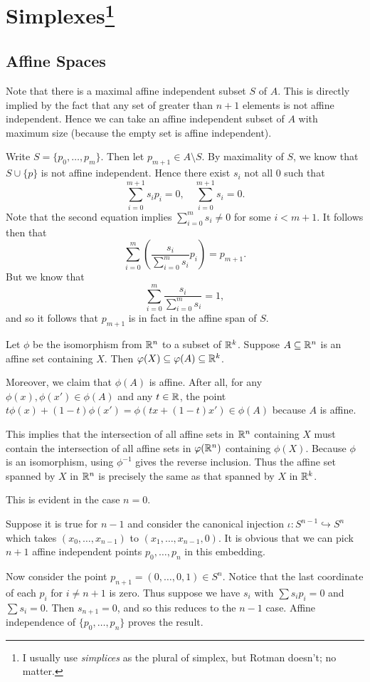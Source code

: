 \documentclass[../../solutions.tex]{subfiles}
\begin{document}
\section[Simplexes]{Simplexes\footnote{I usually use \emph{simplices} as the plural of simplex, but Rotman doesn't; no matter.}}
\subsection{Affine Spaces}
\begin{exercise} \leavevmode
Note that there is a maximal affine independent subset $S$ of $A$. This is directly implied by the fact that any set of greater than $n+1$ elements is not affine independent. Hence we can take an affine independent subset of $A$ with maximum size (because the empty set is affine independent). 

Write $S=\{p_0,\dots,p_m\}$. Then let $p_{m+1}\in A\setminus S$. By maximality of $S$, we know that $S\cup\{p\}$ is not affine independent. Hence there exist $s_i$ not all 0 such that \[\sum_{i=0}^{m+1}s_ip_i=0,\quad\sum_{i=0}^{m+1}s_i=0.\] Note that the second equation implies $\sum_{i=0}^ms_i\ne0$ for some $i<m+1$. It follows then that \[\sum_{i=0}^m\left(\frac{s_i}{\sum_{i=0}^ms_i}p_i\right)=p_{m+1}.\] But we know that \[\sum_{i=0}^m\frac{s_i}{\sum_{i=0}^ms_i}=1,\] and so it follows that $p_{m+1}$ is in fact in the affine span of $S$. 
\end{exercise} 

\begin{exercise} \leavevmode
Let $\phi$ be the isomorphism from $\mathbb{R}^n$ to a subset of $\mathbb{R}^k$. Suppose $A\subseteq\mathbb{R}^n$ is an affine set containing $X$. Then $\varphi(X)\subseteq\varphi(A)\subseteq\mathbb{R}^k$. 

Moreover, we claim that $\phi(A)$ is affine. After all, for any $\phi(x),\phi(x')\in\phi(A)$ and any $t\in\mathbb{R}$, the point $t\phi(x)+(1-t)\phi(x')=\phi(tx+(1-t)x')\in\phi(A)$ because $A$ is affine. 

This implies that the intersection of all affine sets in $\mathbb{R}^n$ containing $X$ must contain the intersection of all affine sets in $\varphi(\mathbb{R}^n)$ containing $\phi(X)$. Because $\phi$ is an isomorphism, using $\phi^{-1}$ gives the reverse inclusion. Thus the affine set spanned by $X$ in $\mathbb{R}^n$ is precisely the same as that spanned by $X$ in $\mathbb{R}^k$. 
\end{exercise} 

\begin{exercise} \leavevmode
This is evident in the case $n=0$. 

Suppose it is true for $n-1$ and consider the canonical injection $\iota:S^{n-1}\hookrightarrow S^n$ which takes $(x_0,\dots,x_{n-1})$ to $(x_1,\dots,x_{n-1},0)$. It is obvious that we can pick $n+1$ affine independent points $p_0,\dots,p_n$ in this embedding. 

Now consider the point $p_{n+1}=(0,\dots,0,1)\in S^n$. Notice that the last coordinate of each $p_i$ for $i\ne n+1$ is zero. Thus suppose we have $s_i$ with $\sum s_ip_i=0$ and $\sum s_i=0$. Then $s_{n+1}=0$, and so this reduces to the $n-1$ case. Affine independence of $\{p_0,\dots,p_n\}$ proves the result. 
\end{exercise} 
\end{document}
